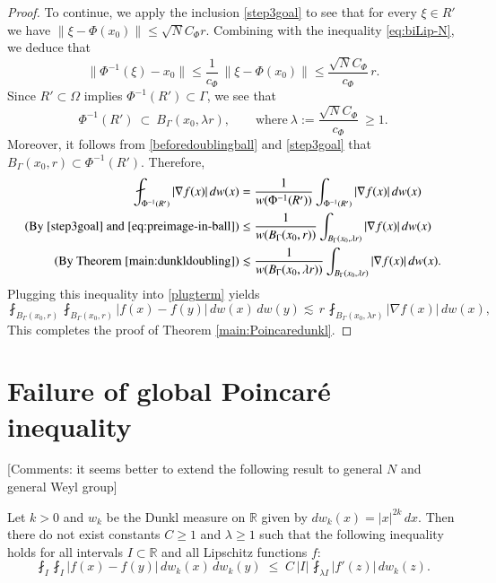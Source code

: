 \documentclass[12pt]{amsart}
\begin{document}
\begin{proof}
To continue, we apply the inclusion \eqref{step3goal}  to see that for every $\xi\in R'$ we have $\|\xi-\Phi(x_0)\|\le \sqrt{N}C_\Phi r$.
Combining with the inequality \eqref{eq:biLip-N}, we deduce that
\[
\|\Phi^{-1}(\xi)-x_0\|
\le \frac{1}{c_\Phi}\,\|\xi-\Phi(x_0)\|
\le \frac{\sqrt{N}C_\Phi}{c_\Phi}\,r.
\]
Since $R'\subset\Omega$ implies $\Phi^{-1}(R')\subset\Gamma$, we see that
\begin{equation}\label{eq:preimage-in-ball}
\Phi^{-1}(R')\ \subset\ B_\Gamma(x_0,\lambda r),
\qquad \text{where}\
\lambda:=\frac{\sqrt{N}C_\Phi}{c_\Phi}\ \ge 1.
\end{equation}
Moreover, it follows from \eqref{beforedoublingball} and \eqref{step3goal} that $B_{\Gamma}(x_0,r)\subset \Phi^{-1}(R')$. Therefore,
\begin{align*}
\fint_{\Phi^{-1}(R')}|\nabla f(x)|\,dw(x)
&=\frac{1}{w(\Phi^{-1}(R'))}\int_{\Phi^{-1}(R')}|\nabla f(x)|\,dw(x)\\
(\text{By}\  \eqref{step3goal}\ \text{and}\ \eqref{eq:preimage-in-ball})&\le \frac{1}{w(B_\Gamma(x_0,r))}\int_{B_\Gamma(x_0,\lambda r)}|\nabla f(x)|\,dw(x)\\
(\text{By Theorem} \ \ref{main:dunkldoubling})&\lesssim \frac{1}{w(B_\Gamma(x_0,\lambda r))}\int_{B_\Gamma(x_0,\lambda r)}|\nabla f(x)|\,dw(x).
\end{align*}
Plugging this inequality into \eqref{plugterm} yields
\[
\fint_{B_\Gamma(x_0,r)}\fint_{B_\Gamma(x_0,r)}
|f(x)-f(y)|\,dw(x)\,dw(y)
\lesssim\,r\,\fint_{B_\Gamma(x_0,\lambda r)}|\nabla f(x)|\,dw(x),
\]
This completes the proof of Theorem \ref{main:Poincaredunkl}.
\end{proof}


\section{Failure of global Poincar\'e inequality}
\setcounter{equation}{0}

{\color{red}[Comments: it seems better to extend the following result to general $N$ and general Weyl group]}
\begin{proposition}\label{lem:counterexample-Poincare}
Let $k>0$ and $w_k$ be the Dunkl measure on $\mathbb{R}$ given by $dw_k(x)=|x|^{2k}\,dx$. Then there do not exist constants $C\ge1$ and $\lambda\ge1$ such that the following inequality holds for all intervals $I\subset\mathbb{R}$ and all Lipschitz functions $f$:
\begin{equation}\label{eq:Poincare-claim}
\fint_{I}\fint_{I} |f(x)-f(y)|\,dw_k(x)\,dw_k(y)
\;\le\; C\,|I|\,\fint_{\lambda I} |f'(z)|\,dw_k(z).
\end{equation}
\end{proposition}
\end{document}
